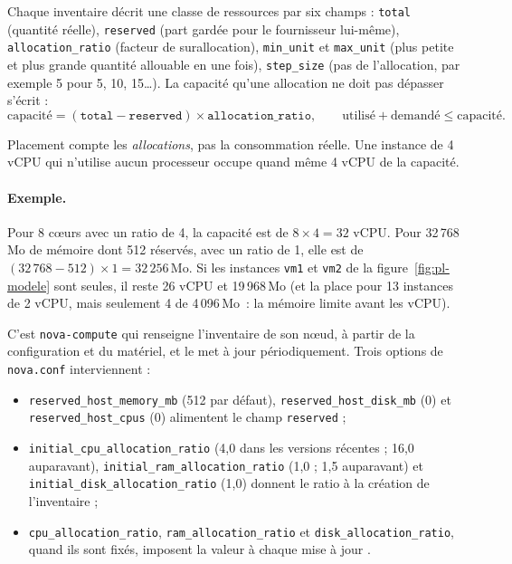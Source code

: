 Chaque inventaire décrit une classe de ressources par six champs \parencite{placement-api-ref} :
\texttt{total} (quantité réelle), \texttt{reserved} (part gardée pour le fournisseur lui-même),
\texttt{allocation\_ratio} (facteur de \gls{surallocation}), \texttt{min\_unit} et \texttt{max\_unit} (plus petite et
plus grande quantité allouable en une fois), \texttt{step\_size} (pas de l'allocation, par exemple 5 pour 5, 10, 15\dots).
La capacité qu'une allocation ne doit pas dépasser s'écrit \parencite{placement-source} :
\[
\text{capacité} = (\texttt{total} - \texttt{reserved}) \times \texttt{allocation\_ratio},
\qquad
\text{utilisé} + \text{demandé} \le \text{capacité}.
\]

\begin{pointcle}
Placement compte les \emph{allocations}, pas la consommation réelle. Une instance de 4 vCPU qui n'utilise
aucun processeur occupe quand même 4 vCPU de la capacité.
\end{pointcle}

\paragraph{Exemple.} Pour 8 cœurs avec un ratio de 4, la capacité est de $8\times4=32$ vCPU. Pour
32\,768\,Mo de mémoire dont 512 réservés, avec un ratio de 1, elle est de $(32\,768-512)\times1=32\,256$\,Mo. Si les
instances \texttt{vm1} et \texttt{vm2} de la figure~\ref{fig:pl-modele} sont seules, il reste 26 vCPU et
19\,968\,Mo (et la place pour 13 instances de 2 vCPU, mais seulement 4 de 4\,096\,Mo~: la mémoire limite avant les
vCPU).

C'est \texttt{nova-compute} qui renseigne l'inventaire de son nœud, à partir de la configuration et du matériel,
et le met à jour périodiquement. Trois options de \texttt{nova.conf} interviennent \parencite{nova-config} :

\begin{itemize}
  \item \texttt{reserved\_\allowbreak host\_\allowbreak memory\_\allowbreak mb} (512 par défaut), \texttt{reserved\_\allowbreak host\_\allowbreak disk\_\allowbreak mb} (0) et
        \texttt{reserved\_\allowbreak host\_\allowbreak cpus} (0) alimentent le champ \texttt{reserved} ;
  \item \texttt{initial\_\allowbreak cpu\_\allowbreak allocation\_\allowbreak ratio} (4,0 dans les versions récentes ; 16,0 auparavant),
        \texttt{initial\_\allowbreak ram\_\allowbreak allocation\_\allowbreak ratio} (1,0 ; 1,5 auparavant) et
        \texttt{initial\_\allowbreak disk\_\allowbreak allocation\_\allowbreak ratio} (1,0) donnent le ratio à la création de l'inventaire ;
  \item \texttt{cpu\_\allowbreak allocation\_\allowbreak ratio}, \texttt{ram\_\allowbreak allocation\_\allowbreak ratio} et \texttt{disk\_\allowbreak allocation\_\allowbreak ratio}, quand ils sont
        fixés, imposent la valeur à chaque mise à jour \parencite{nova-scheduling}.
\end{itemize}

